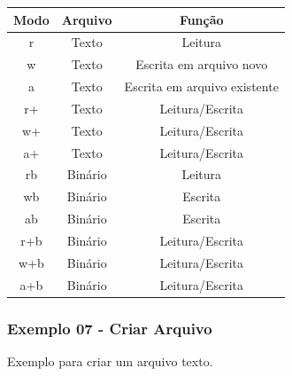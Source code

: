 \documentclass[12pt,a4paper]{article}
\begin{document}
    \begin{longtable}[]{@{}ccc@{}}
\toprule
\textbf{Modo} & \textbf{Arquivo} & \textbf{Função}\tabularnewline
\midrule
\endhead
r & Texto & Leitura\tabularnewline
w & Texto & Escrita em arquivo novo\tabularnewline
a & Texto & Escrita em arquivo existente\tabularnewline
r+ & Texto & Leitura/Escrita\tabularnewline
w+ & Texto & Leitura/Escrita\tabularnewline
a+ & Texto & Leitura/Escrita\tabularnewline
rb & Binário & Leitura\tabularnewline
wb & Binário & Escrita\tabularnewline
ab & Binário & Escrita\tabularnewline
r+b & Binário & Leitura/Escrita\tabularnewline
w+b & Binário & Leitura/Escrita\tabularnewline
a+b & Binário & Leitura/Escrita\tabularnewline
\bottomrule
\end{longtable}

    \hypertarget{exemplo-07---criar-arquivo}{%
\subsubsection{Exemplo 07 - Criar
Arquivo}\label{exemplo-07---criar-arquivo}}

Exemplo para criar um arquivo texto.
\end{document}
